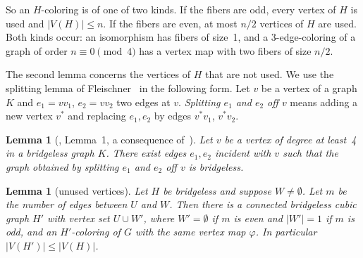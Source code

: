 \documentclass[11pt]{article}
\newtheorem{lemma}[theorem]{Lemma}
\theoremstyle{definition}
\theoremstyle{remark}
\begin{document}
So an $H$-coloring is of one of two kinds. If the fibers are odd, every vertex of $H$ is used and
$|V(H)| \le n$. If the fibers are even, at most $n/2$ vertices of $H$ are used. Both kinds occur:
an isomorphism has fibers of size~1, and a 3-edge-coloring of a graph of order $n \equiv 0
\pmod 4$ has a vertex map with two fibers of size $n/2$.

The second lemma concerns the vertices of $H$ that are not used. We use the splitting lemma of
Fleischner~\cite{Fleischner1992} in the following form. Let $v$ be a vertex of a graph $K$ and
$e_1 = vv_1$, $e_2 = vv_2$ two edges at $v$. \emph{Splitting $e_1$ and $e_2$ off $v$} means adding
a new vertex $v^*$ and replacing $e_1, e_2$ by edges $v^*v_1$, $v^*v_2$.

\begin{lemma}[\cite{KaiserKLW2007}, Lemma~1, a consequence of~\cite{Fleischner1992}]\label{lem:split}
Let $v$ be a vertex of degree at least~4 in a bridgeless graph $K$. There exist edges $e_1, e_2$
incident with $v$ such that the graph obtained by splitting $e_1$ and $e_2$ off $v$ is bridgeless.
\end{lemma}

\begin{lemma}[unused vertices]\label{lem:unused}
Let $H$ be bridgeless and suppose $W \ne \emptyset$. Let $m$ be the number of edges between $U$
and $W$. Then there is a connected bridgeless cubic graph $H'$ with vertex set $U \cup W'$, where
$W' = \emptyset$ if $m$ is even and $|W'| = 1$ if $m$ is odd, and an $H'$-coloring of $G$ with
the same vertex map $\varphi$. In particular $|V(H')| \le |V(H)|$.
\end{lemma}
\end{document}

